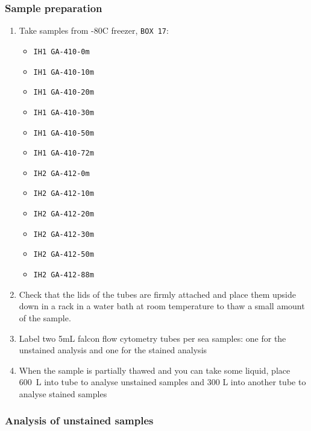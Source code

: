 \subsubsection{Sample preparation}
\begin{enumerate}
\item Take samples from -80\degree C freezer, \texttt{BOX 17}:
	\begin{itemize}
	\item[] \texttt{IH1 GA-410-0m}
	\item[] \texttt{IH1 GA-410-10m}
	\item[] \texttt{IH1 GA-410-20m}
	\item[] \texttt{IH1 GA-410-30m}
	\item[] \texttt{IH1 GA-410-50m}
	\item[] \texttt{IH1 GA-410-72m}
	\\
	\item[] \texttt{IH2 GA-412-0m}
	\item[] \texttt{IH2 GA-412-10m}
	\item[] \texttt{IH2 GA-412-20m}
	\item[] \texttt{IH2 GA-412-30m}
	\item[] \texttt{IH2 GA-412-50m}
	\item[] \texttt{IH2 GA-412-88m}
	\end{itemize}
\item Check that the lids of the tubes are firmly attached and place them upside down in a rack in a water bath at room temperature to thaw a small amount of the sample. 
\item Label two 5mL falcon flow cytometry tubes per sea samples: one for the unstained analysis and one for the stained analysis
\item When the sample is partially thawed and you can take some liquid, place 600~\textmu L into tube to analyse unstained samples and 300 \textmu L into another tube to analyse stained samples
\end{enumerate}

\subsubsection{Analysis of unstained samples}


